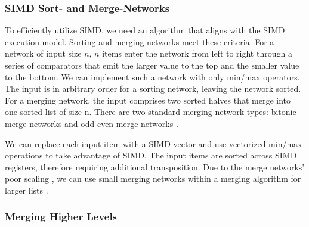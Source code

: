 \subsubsection{SIMD Sort- and Merge-Networks}

To efficiently utilize SIMD, we need an algorithm that aligns with the SIMD execution model. 
Sorting and merging networks meet these criteria. 
For a network of input size $n$, $n$ items enter the network from left to right through a series of 
comparators that emit the larger value to the top and the smaller value to the bottom. We can
implement such a network with only min/max operators. The input is in arbitrary order for a 
sorting network, leaving the network sorted. For a merging network, the input comprises two sorted
halves that merge into one sorted list of size n. There are two standard merging network types:
bitonic merge networks and odd-even merge networks \cite{10.14778/1454159.1454171}. 

We can replace each input item with a SIMD vector and use vectorized min/max operations to take
advantage of SIMD. The input items are sorted across SIMD registers, therefore requiring additional
transposition.
Due to the merge networks' poor scaling \cite{DBLP:journals/vldb/MullerTA12}, we can use small merging networks within a merging
algorithm for larger lists \cite{4336211}.

%

\subsubsection{Merging Higher Levels}

